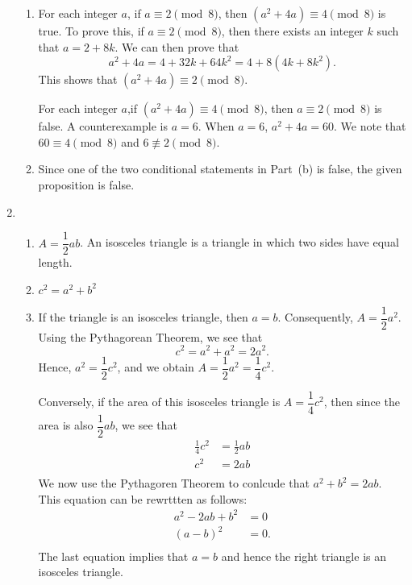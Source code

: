 \begin{enumerate}
\begin{enumerate}
\item For each integer $a$, if $a \equiv 2 \pmod 8$, then $(a^2 + 4a) \equiv 4 \pmod 8$ is true.  To prove this, if $a \equiv 2 \pmod 8$, then there exists an integer $k$ such that 
$a = 2 + 8k$.  We can then prove that
\[
a^2 + 4a = 4 + 32k + 64k^2 = 4 + 8(4k + 8k^2).
\]
This shows that $(a^2 + 4a) \equiv 2 \pmod 8$.

For each integer $a$,if $(a^2 + 4a) \equiv 4 \pmod 8$, then $a \equiv 2 \pmod 8$ is false.  A counterexample is $a = 6$.  When $a = 6$, $a^2 + 4a = 60$.  We note that $60 \equiv 4 \pmod 8$ and $6 \not \equiv 2 \pmod 8$.

\item Since one of the two conditional statements in Part~(b) is false, the given proposition is false.
\end{enumerate}


\item %
\begin{enumerate}
\item  $A = \dfrac{1}{2}ab$.  An isosceles triangle is a triangle in which two sides have equal length.

\item $c^2 = a^2 + b^2$
\end{enumerate}

\begin{enumerate} \setcounter{enumii}{2}

\item If the triangle is an isosceles triangle, then $a = b$.  Consequently, 
$A = \dfrac{1}{2}a^2$.  Using the Pythagorean Theorem, we see that
\[
c^2 = a^2 + a^2 = 2a^2.
\]
Hence, $a^2 = \dfrac{1}{2}c^2$, and we obtain $A = \dfrac{1}{2}a^2 = \dfrac{1}{4}c^2$.

Conversely, if the area of this isosceles triangle is $A = \dfrac{1}{4}c^2$, then since the area is also $\dfrac{1}{2}ab$, we see that
\[
\begin{aligned}
\frac{1}{4}c^2 &= \frac{1}{2}ab \\
c^2 &= 2ab \\
\end{aligned}
\]
We now use the Pythagoren Theorem to conlcude that $a^2 + b^2 = 2ab$.  This equation can be rewrttten as follows:
\[
\begin{aligned}
a^2 - 2ab + b^2 &= 0 \\
\left( a - b \right)^2 &= 0. \\
\end{aligned}
\]
The last equation implies that $a = b$ and hence the right triangle is an isosceles triangle.
\end{enumerate}


\end{enumerate}
